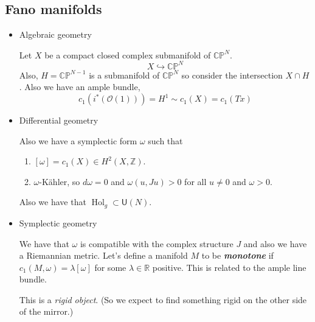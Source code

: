 \subsection*{Fano manifolds}
	\begin{itemize}
		\item Algebraic geometry
		
		Let $X$ be a compact closed complex submanifold of $\mathbb{C}\mathbb{P}^N$.
		\[X\hookrightarrow \mathbb{C}\mathbb{P}^N\]
		Also, $H=\mathbb{C}\mathbb{P}^{N-1}$ is a submanifold of $\mathbb{C}\mathbb{P}^N$ so consider the intersection $X\cap H$. Also we have an ample bundle,
		\[c_1(i^*(\mathcal{O}(1)))=H^1\sim c_1(X)=c_1(Tx)\]
		
		\item Differential geometry
		
		Also we have a symplectic form $\omega$ such that
		\begin{enumerate}
			\item $[\omega]=c_1(X)\in H^2(X,\mathbb{Z})$.
			\item $\omega$-Kähler, so $d\omega=0$ and $\omega(u,Ju)>0$ for all $u\neq 0$ and $\omega>0$.
		\end{enumerate}
		Also we have that $\operatorname{H o l}_g\subset \mathsf{U}(N)$.
		
		\item Symplectic geometry
		
		We have that $\omega$ is compatible with the complex structure $J$ and also we have a Riemannian metric. Let's define a manifold $M$ to be \textbf{\textit{monotone}} if $c_1(M,\omega)=\lambda[\omega]$ for some $\lambda\in\mathbb{R}$ positive. This is related to the ample line bundle.
		
		This is a \textit{rigid object}. (So we expect to find something rigid on the other side of the mirror.)
	\end{itemize}
